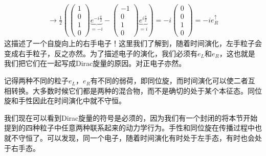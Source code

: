 \begin{align}
\to\frac{1}{2}\left(\left(\begin{matrix}1\\0\\1\\0\end{matrix}\right)\underbrace{e^{-i\frac{\pi}{2}}}_{=-i}-\left(\begin{matrix}-1\\0\\1\\0\end{matrix}\right)\underbrace{e^{i\frac{\pi}{2}}}_{=i}\right)=-i\left(\begin{matrix}0\\0\\1\\0\end{matrix}\right)=-ie_R^\uparrow
\end{align}
这描述了一个自旋向上的右手电子！这里我们了解到，随着时间演化，左手粒子会变成右手粒子，反之亦然。为了描述电子的演化，我们必须有$e_L$和$e_R$，这也就是我们把它们在一起写成Dirac旋量的原因。对正电子亦然。

记得两种不同的粒子$e_L$，$e_R$有不同的弱荷，即同位旋，而时间演化可以使二者互相转换。大多数时候它们都是两种的混合物，而不是确切的处于某个本征态。同位旋和手性因此在时间演化中就不守恒。

我们现在可以看到Dirac旋量的符号是必须的，因为我们有一个封闭的将本节开始提到的四种粒子中任意两种联系起来的动力学行为。手性和同位旋在传播过程中也就不守恒了。可以发现，同一个电子，随着时间演化有时处于左手态，有时也会处于右手态。




